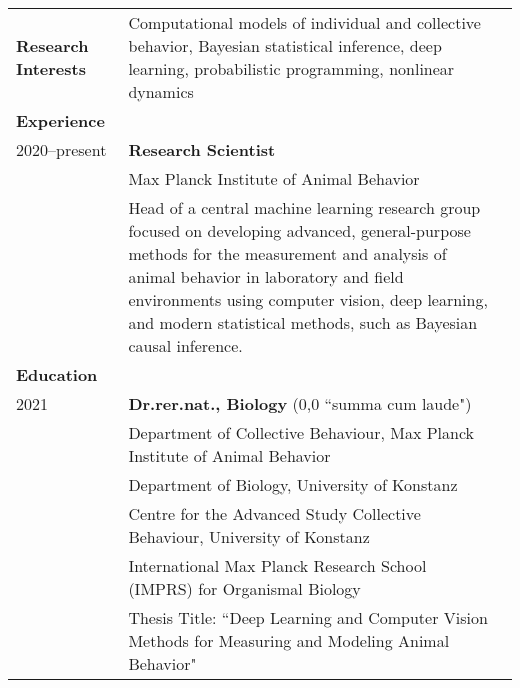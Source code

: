 \documentclass[letterpaper,10pt,oneside]{article}
\newcommand{\tabitem}{\hspace{2mm}\textbullet\hspace{2mm}}
\begin{document}
\begin{small}
\noindent \begin{longtable}{@{} l p{5in}l}

\large{\textbf{Research Interests}}
& Computational models of individual and collective behavior, Bayesian statistical inference, deep learning, probabilistic programming, nonlinear dynamics \vspace{2mm}\\ 

\Large{\textbf{Experience}} \vspace{2mm} \\
\large{2020--present} 
& \textbf{Research Scientist} \\
& {Max Planck Institute of Animal Behavior} \\
& \tabitem Head of a central machine learning research group focused on developing advanced, general-purpose methods for the measurement and analysis of animal behavior in laboratory and field environments using computer vision, deep learning, and modern statistical methods, such as Bayesian causal inference.\vspace{5mm} \\

\Large{\textbf{Education}} \vspace{2mm} \\
 \large{2021} 
 & \textbf{Dr.rer.nat., Biology} (0,0 ``summa cum laude")\\
  &   {Department of Collective Behaviour, Max Planck Institute of Animal Behavior} \\
 &   {Department of Biology, University of Konstanz} \\
 &  {Centre for the Advanced Study Collective Behaviour, University of Konstanz} \\
 &   {International Max Planck Research School (IMPRS) for Organismal Biology} \\
 & \tabitem Thesis Title: ``Deep Learning and Computer Vision Methods for Measuring and Modeling Animal Behavior" \vspace{2mm} \\


\end{longtable}
\end{small}
\end{document}
